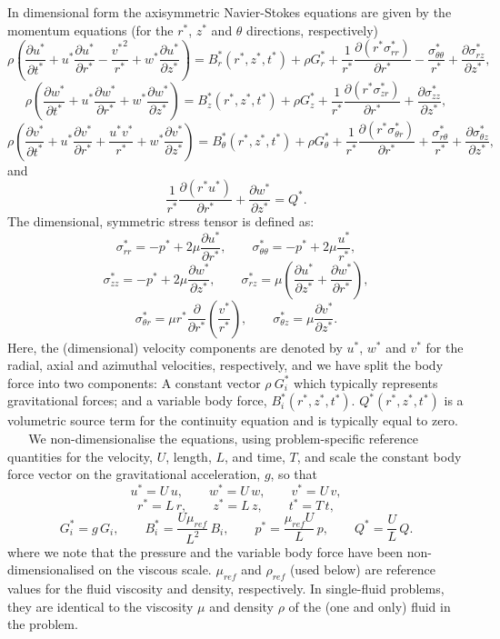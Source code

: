In dimensional form the axisymmetric Navier-\/\+Stokes equations are given by the momentum equations (for the $ r^* $, $ z^* $ and $ \theta $ directions, respectively) \[ \rho\left(\frac{\partial u^*}{\partial t^*} + {u^*}\frac{\partial u^*}{\partial r^*} - \frac{{v^*}^2}{r^*} + {w^*}\frac{\partial u^*}{\partial z^*} \right) = B_r^*\left(r^*,z^*,t^*\right)+ \rho G_r^*+ \frac{1}{r^*} \frac{\partial\left({r^*}\sigma_{rr}^*\right)}{\partial r^*} - \frac{\sigma_{\theta\theta}^*}{r^*} + \frac{\partial\sigma_{rz}^*}{\partial z^*}, \] \[ \rho\left(\frac{\partial w^*}{\partial t^*} + {u^*}\frac{\partial w^*}{\partial r^*} + {w^*}\frac{\partial w^*}{\partial z^*} \right) = B_z^*\left(r^*,z^*,t^*\right)+\rho G_z^*+ \frac{1}{r^*}\frac{\partial\left({r^*}\sigma_{zr}^*\right)}{\partial r^*} + \frac{\partial\sigma_{zz}^*}{\partial z^*}, \] \[ \rho\left(\frac{\partial v^*}{\partial t^*} + {u^*}\frac{\partial v^*}{\partial r^*} + \frac{u^* v^*}{r^*} +{w^*}\frac{\partial v^*}{\partial z^*} \right)= B_\theta^*\left(r^*,z^*,t^*\right)+ \rho G_\theta^*+ \frac{1}{r^*}\frac{\partial\left({r^*}\sigma_{\theta r}^*\right)}{\partial r^*} + \frac{\sigma_{r\theta}^*}{r^*} + \frac{\partial\sigma_{\theta z}^*}{\partial z^*}, \] and \[ \frac{1}{r^*}\frac{\partial\left(r^*u^*\right)}{\partial r^*} + \frac{\partial w^*}{\partial z^*} = Q^*. \] The dimensional, symmetric stress tensor is defined as\+: \[ \sigma_{rr}^* = -p^* + 2\mu\frac{\partial u^*}{\partial r^*}, \qquad \sigma_{\theta\theta}^* = -p^* +2\mu\frac{u^*}{r^*}, \] \[ \sigma_{zz}^* = -p^* + 2\mu\frac{\partial w^*}{\partial z^*}, \qquad \sigma_{rz}^* = \mu\left(\frac{\partial u^*}{\partial z^*} + \frac{\partial w^*}{\partial r^*}\right), \] \[ \sigma_{\theta r}^* = \mu r^*\frac{\partial}{\partial r^*} \left(\frac{v^*}{r^*}\right), \qquad \sigma_{\theta z}^* = \mu\frac{\partial v^*}{\partial z^*}. \] Here, the (dimensional) velocity components are denoted by $ u^* $, $ w^* $ and $ v^* $ for the radial, axial and azimuthal velocities, respectively, and we have split the body force into two components\+: A constant vector $ \rho \ G_i^* $ which typically represents gravitational forces; and a variable body force, $ B_i^*(r^*,z^*,t^*) $. $ Q^*(r^*,z^*,t^*) $ is a volumetric source term for the continuity equation and is typically equal to zero. ~\newline
~\newline
We non-\/dimensionalise the equations, using problem-\/specific reference quantities for the velocity, $ U $, length, $ L $, and time, $ T $, and scale the constant body force vector on the gravitational acceleration, $ g $, so that \[ u^* = U\, u, \qquad w^* = U\, w, \qquad v^* = U\, v, \] \[ r^* = L\, r, \qquad z^* = L\, z, \qquad t^* = T\, t, \] \[ G_i^* = g\, G_i, \qquad B_i^* = \frac{U\mu_{ref}}{L^2}\, B_i, \qquad p^* = \frac{\mu_{ref} U}{L}\, p, \qquad Q^* = \frac{U}{L}\, Q. \] where we note that the pressure and the variable body force have been non-\/dimensionalised on the viscous scale. $ \mu_{ref} $ and $ \rho_{ref} $ (used below) are reference values for the fluid viscosity and density, respectively. In single-\/fluid problems, they are identical to the viscosity $ \mu $ and density $ \rho $ of the (one and only) fluid in the problem. ~\newline
